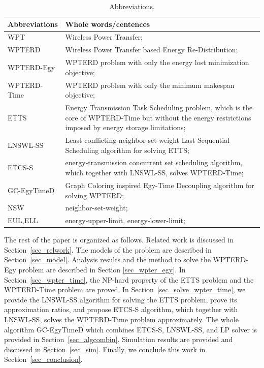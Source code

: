 \documentclass[journal,10pt]{IEEEtran}
\begin{document}
\begin{table}[!htbp]
\centering
\caption{Abbreviations.}
\label{T0}
\footnotesize{
\begin{tabular}
{|p{}|p{}|}
\hline
\hline
\textbf{Abbreviations} & Whole words/centences\\
\hline
\hline
WPT & Wireless Power Transfer;\\
\hline
WPTERD & Wireless Power Transfer based Energy Re-Distribution;\\
\hline
WPTERD-Egy & WPTERD problem with only the energy lost minimization objective;\\
\hline
WPTERD-Time & WPTERD problem with only the minimum makespan objective;\\
\hline
ETTS & Energy Transmission Task Scheduling problem, which is the core of WPTERD-Time but without the energy restrictions imposed by energy storage limitations;\\
\hline
LNSWL-SS & Least conflicting-neighbor-set-weight Last Sequential Scheduling algorithm for solving ETTS;\\
\hline
ETCS-S & energy-transmission concurrent set scheduling algorithm, which together with LNSWL-SS, solves WPTERD-Time;\\
\hline
GC-EgyTimeD & Graph Coloring inspired Egy-Time Decoupling algorithm  for solving WPTERD;\\
\hline
NSW & neighbor-set-weight;\\
\hline
EUL,ELL & energy-upper-limit, energy-lower-limit;\\
\hline
\hline
\end{tabular}
}
\end{table}

The rest of the paper is organized as follows. Related work is discussed in Section~\ref{sec_relwork}. The models of the problem are described in Section~\ref{sec_model}. Analysis results and the method to solve the WPTERD-Egy problem are described in Section \ref{sec_wpter_egy}. In Section~\ref{sec_wpter_time}, the NP-hard property of the ETTS problem and the WPTERD-Time problem are proved. In Section~\ref{sec_solve_wpter_time}, we provide the LNSWL-SS algorithm for solving the ETTS problem, prove its approximation ratios, and propose ETCS-S algorithm, which together with LNSWL-SS, solves the WPTERD-Time problem approximately. The whole algorithm GC-EgyTimeD which combines ETCS-S, LNSWL-SS, and LP solver is provided in Section~\ref{sec_algcombin}. Simulation results are provided and discussed in Section~\ref{sec_sim}. Finally, we conclude this work in Section~\ref{sec_conclusion}.
\end{document}
